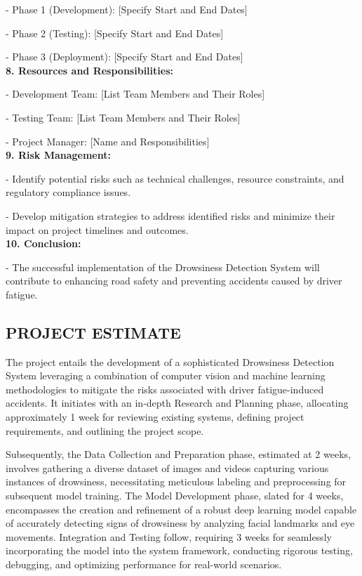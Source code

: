 \documentclass[12pt]{article}
\begin{document}
   - Phase 1 (Development): [Specify Start and End Dates]

   - Phase 2 (Testing): [Specify Start and End Dates]

   - Phase 3 (Deployment): [Specify Start and End Dates]\\
\textbf{8. Resources and Responsibilities:}

   - Development Team: [List Team Members and Their Roles]

   - Testing Team: [List Team Members and Their Roles]

   - Project Manager: [Name and Responsibilities]\\
\textbf{9. Risk Management:}

   - Identify potential risks such as technical challenges, resource constraints, and regulatory compliance issues.

   - Develop mitigation strategies to address identified risks and minimize their impact on project timelines and outcomes.\\
\textbf{10. Conclusion:}

    - The successful implementation of the Drowsiness Detection System will contribute to enhancing road safety and preventing accidents caused by driver fatigue.

\subsection{ PROJECT ESTIMATE }
The project entails the development of a sophisticated Drowsiness Detection System leveraging a combination of computer vision and machine learning methodologies to mitigate the risks associated with driver fatigue-induced accidents. It initiates with an in-depth Research and Planning phase, allocating approximately 1 week for reviewing existing systems, defining project requirements, and outlining the project scope. 

Subsequently, the Data Collection and Preparation phase, estimated at 2 weeks, involves gathering a diverse dataset of images and videos capturing various instances of drowsiness, necessitating meticulous labeling and preprocessing for subsequent model training. The Model Development phase, slated for 4 weeks, encompasses the creation and refinement of a robust deep learning model capable of accurately detecting signs of drowsiness by analyzing facial landmarks and eye movements. Integration and Testing follow, requiring 3 weeks for seamlessly incorporating the model into the system framework, conducting rigorous testing, debugging, and optimizing performance for real-world scenarios. 
\end{document}
